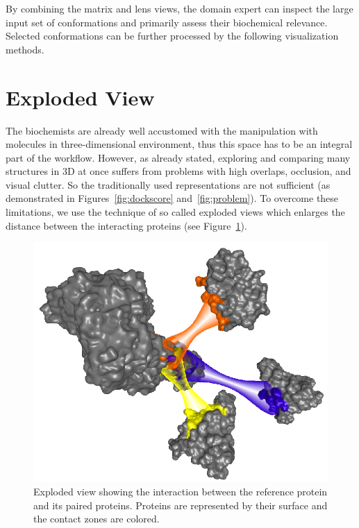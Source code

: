 \documentclass[journal]{vgtc}                %
\begin{document}
By combining the matrix and lens views, the domain expert can inspect the large input set of conformations and primarily assess their biochemical relevance.
Selected conformations can be further processed by the following visualization methods.

\section{Exploded View}
The biochemists are already well accustomed with the manipulation with molecules in three-dimensional environment, thus this space has to be an integral part of the workflow.
However, as already stated, exploring and comparing many structures in 3D at once suffers from problems with high overlaps, occlusion, and visual clutter. 
So the traditionally used representations are not sufficient (as demonstrated in Figures~\ref{fig:dockscore} and~\ref{fig:problem}).
To overcome these limitations, we use the technique of so called exploded views which enlarges the distance between the interacting proteins (see Figure~\ref{fig:exploded}). 

\begin{figure}[bt]
  \centering
  \includegraphics[width=1.0\columnwidth]{exploded.png}
  \caption{Exploded view showing the interaction between the reference protein and its paired proteins. Proteins are represented by their surface and the contact zones are colored.}
  \label{fig:exploded}
\end{figure}
\end{document}
